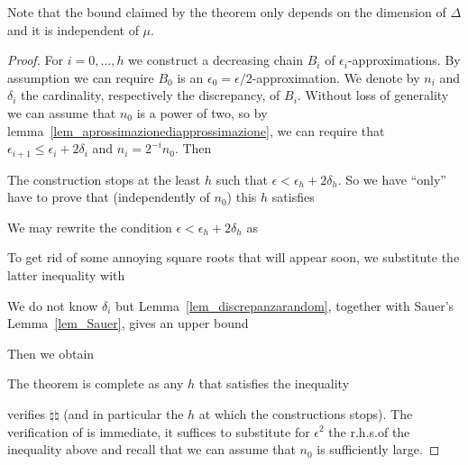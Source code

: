 \documentclass[creche.tex]{subfiles}
\begin{document}
Note that the bound claimed by the theorem only depends on the dimension of $\Delta$ and it is independent of $\mu$.

\begin{proof}
For $i=0,\dots,h$ we construct a decreasing chain $B_i$ of $\epsilon_i$-approximations. By assumption we can require $B_0$ is an $\epsilon_0=\epsilon/2$-approximation. We denote by $n_i$ and $\delta_i$ the cardinality, respectively the discrepancy, of $B_i$. Without loss of generality we can assume that $n_0$ is a power of two, so by lemma~\ref{lem_aprossimazionediapprossimazione}, we can require that $\epsilon_{i+1}\le\epsilon_i+2\delta_i$ and $n_i=2^{-i}n_0$. Then


The construction stops at the least $h$ such that $\epsilon<\epsilon_h+2\delta_h$. So we have ``only'' have to prove that (independently of $n_0$) this $h$ satisfies


We may rewrite the condition $\epsilon<\epsilon_h+2\delta_h$ as


To get rid of some annoying square roots that will appear soon, we substitute the latter inequality with


% 

We do not know $\delta_i$ but Lemma~\ref{lem_discrepanzarandom}, together with Sauer's Lemma~\ref{lem_Sauer}, gives an upper bound




Then we obtain


The theorem is complete as any $h$ that satisfies the inequality


verifies $\natural\natural$ (and in particular the $h$ at which the constructions stops). The verification of is immediate, it suffices to substitute for $\epsilon^2$ the r.h.s.\@ of the inequality above and recall that we can assume that $n_0$ is sufficiently large.
\end{proof}
\end{document}
